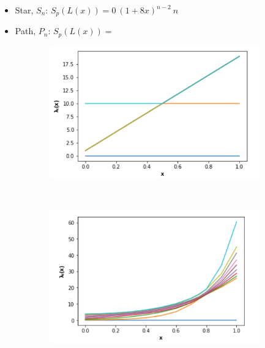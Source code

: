 \documentclass[10pt,a4paper]{article}
\begin{document}
		    \begin{itemize}
		    	\item Star, $S_n$: $S_p(L(x)) = {0~ (1+8x)^{n-2}~ n}$\\
		    	\item Path, $P_n$: $S_p(L(x)) = { }$
		    \end{itemize}
		    \begin{figure}[H]
		    	\centering
		    	\begin{subfigure}[b]{0.45\textwidth}
		    		\includegraphics[width= \textwidth]{images/Star-network-eigenplot.png}
		    		\label{star-spectra}
		    	\end{subfigure}~
		    	\begin{subfigure}[b]{0.45\textwidth}
		    		\includegraphics[width= \textwidth]{images/Path-network-eigenplot.png}
		    		\label{path-spectra}
		    	\end{subfigure} \\

\end{figure}
\end{document}
